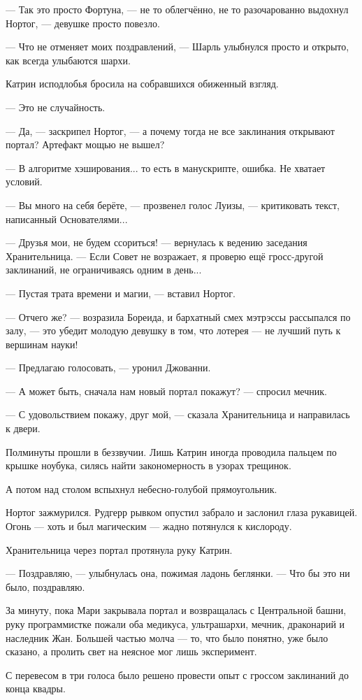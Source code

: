 --- Так это просто Фортуна, --- не то облегчённо, не то разочарованно выдохнул Нортог,
--- девушке просто повезло.

--- Что не отменяет моих поздравлений, --- Шарль улыбнулся просто и открыто, как всегда улыбаются шархи.

Катрин исподлобья бросила на собравшихся обиженный взгляд.

--- Это не случайность.

--- Да, --- заскрипел Нортог, --- а почему тогда не все заклинания открывают портал? Артефакт мощью не вышел?

--- В алгоритме хэширования... то есть в манускрипте, ошибка. Не хватает условий.

--- Вы много на себя берёте, --- прозвенел голос Луизы, --- критиковать текст, написанный Основателями...

--- Друзья мои, не будем ссориться! --- вернулась к ведению заседания Хранительница.
--- Если Совет не возражает, я проверю ещё гросс-другой заклинаний, не ограничиваясь одним в день...

--- Пустая трата времени и магии, --- вставил Нортог.

--- Отчего же? --- возразила Бореида, и бархатный смех мэтрэссы рассыпался по залу,
--- это убедит молодую девушку в том, что лотерея --- не лучший путь к вершинам науки!

--- Предлагаю голосовать, --- уронил Джованни.

--- А может быть, сначала нам новый портал покажут? --- спросил мечник.

--- С удовольствием покажу, друг мой, --- сказала Хранительница и направилась к двери.

Полминуты прошли в беззвучии. Лишь Катрин иногда проводила пальцем по крышке ноубука,
силясь найти закономерность в узорах трещинок.

\emptypar

А потом над столом вспыхнул небесно-голубой прямоугольник.

Нортог зажмурился.
Рудгерр рывком опустил забрало и заслонил глаза рукавицей.
Огонь --- хоть и был магическим --- жадно потянулся к кислороду.

Хранительница через портал протянула руку Катрин.

--- Поздравляю, --- улыбнулась она, пожимая ладонь беглянки.
--- Что бы это ни было, поздравляю.

За минуту, пока Мари закрывала портал и возвращалась с Центральной башни,
руку программистке пожали оба медикуса, ультрашархи, мечник, драконарий и наследник Жан.
Большей частью молча --- то, что было понятно, уже было сказано,
а пролить свет на неясное мог лишь эксперимент.

С перевесом в три голоса было решено провести опыт с гроссом заклинаний до конца квадры.

\emptypar
